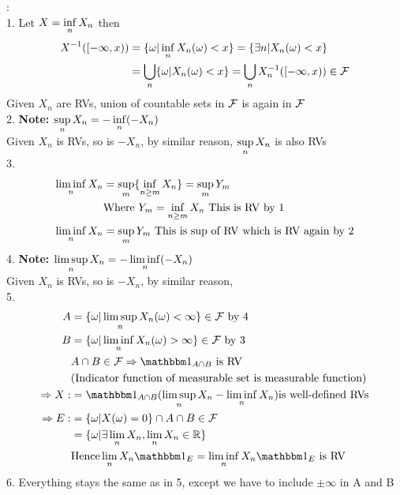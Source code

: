 \newpage
\pf: \\
1. Let $X = \inf\limits_{n} X_n$ then
\begin{align*}
    X^{-1}([-\infty, x)) &= \{\omega| \inf\limits_{n} X_n(\omega) <x\} = \{\exists n| X_n(\omega) < x\} \\
    &= \bigcup\limits_{n}\{\omega |X_n(\omega) < x\} = \bigcup\limits_{n}X_n^{-1}([-\infty, x)) \in \mathcal{F}
\end{align*}Given $X_n$ are RVs, union of countable sets in $\mathcal{F}$ is again in $\mathcal{F}$ \\
2. \textbf{Note: $\sup\limits_{n}X_n = -\inf\limits_{n}(-X_n)$} \\
Given $X_n$ is RVs, so is $-X_n$, by similar reason, $\sup\limits_{n}X_n$ is also RVs \\
3. \begin{align*}
    \liminf\limits_{n} X_n &= \sup\limits_{m}\{\inf\limits_{n\geq m} X_n\} = \sup\limits_{m}Y_m \\
    &\text{Where } Y_m = \inf\limits_{n\geq m} X_n\text{ This is RV by 1} \\
    \liminf\limits_{n} X_n &=\sup\limits_{m}Y_m \text{ This is sup of RV which is RV again by 2}
\end{align*}
4. \textbf{Note: $\limsup\limits_{n}X_n = -\liminf\limits_{n}(-X_n)$} \\
Given $X_n$ is RVs, so is $-X_n$, by similar reason, \\
5. 
\begin{align*}
    A &= \{\omega | \lsup{n}X_n(\omega) < \infty \} \in \F \text{ by 4} \\
    B &= \{\omega | \linf{n}X_n(\omega) > \infty \} \in \F \text{ by 3} \\
    &A\cap B \in \F \Rightarrow \I_{A\cap B} \text{ is RV} \\
    &\text{(Indicator function of measurable set is measurable function)} \\
    \Rightarrow X :&= \I_{A\cap B}(\lsup{n}X_n - \linf{n}X_n) \text{is well-defined RVs} \\
    \Rightarrow E:&= \{\omega | X(\omega)=0\} \cap A\cap B \in \F \\
    &= \{\omega| \exists \lim\limits_{n}X_n, \lim\limits_{n} X_n \in \R\} \\
    &\text{Hence} \lim\limits_{n}X_n \I_{E} = \linf{n}X_n \I_{E} \text{ is RV}
\end{align*}
6.
Everything stays the same as in 5, except we have to include $\pm \infty$ in A and B
